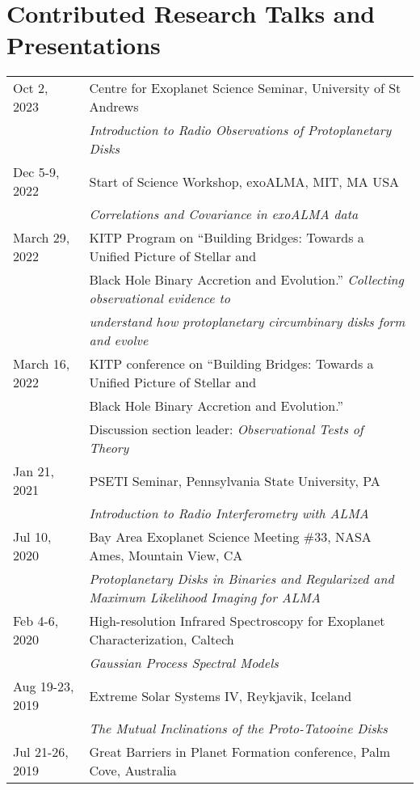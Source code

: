 \section*{Contributed Research Talks and Presentations}
\setlength\LTleft{0pt}
\setlength\LTright{0pt}
\begin{longtable}{@{\hspace{10pt}}p{1.2in}l}
  Oct 2, 2023 & Centre for Exoplanet Science Seminar, University of St Andrews \\
  & \emph{Introduction to Radio Observations of Protoplanetary Disks}\\[\rowskip]
  Dec 5-9, 2022 & Start of Science Workshop, exoALMA, MIT, MA USA \\
  & \emph{Correlations and Covariance in exoALMA data} \\[\rowskip]
  March 29, 2022 & KITP Program on ``Building Bridges: Towards a Unified Picture of Stellar and \\
  & Black Hole Binary Accretion and Evolution.''  \emph{Collecting observational evidence to}\\
  & \emph{understand how protoplanetary circumbinary disks form and evolve}\\[\rowskip] 
  March 16, 2022 & KITP conference on ``Building Bridges: Towards a Unified Picture of Stellar and \\
  & Black Hole Binary Accretion and Evolution.'' \\
  & Discussion section leader: \emph{Observational Tests of Theory}\\[\rowskip] 
  Jan 21, 2021 & PSETI Seminar, Pennsylvania State University, PA \\
  & \emph{Introduction to Radio Interferometry with ALMA}\\[\rowskip]
  Jul 10, 2020 & Bay Area Exoplanet Science Meeting \#33, NASA Ames, Mountain View, CA \\
  & \emph{Protoplanetary Disks in Binaries and Regularized and Maximum Likelihood Imaging for ALMA} \\[\rowskip] 
  Feb 4-6, 2020 & High-resolution Infrared Spectroscopy for Exoplanet Characterization, Caltech \\
  & \emph{Gaussian Process Spectral Models} \\[\rowskip]
  Aug 19-23, 2019 & Extreme Solar Systems IV, Reykjavik, Iceland\\ 
  & \emph{The Mutual Inclinations of the Proto-Tatooine Disks} \\[\rowskip]
  Jul 21-26, 2019 & Great Barriers in Planet Formation conference, Palm Cove, Australia\\

\end{longtable}
